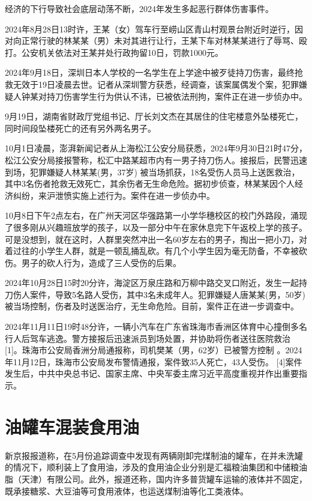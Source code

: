 经济的下行导致社会底层动荡不断，2024年发生多起恶行群体伤害事件。

2024年8月28日13时许，王某（女）驾车行至崂山区青山村观景台附近时逆行，因对向正常行驶的林某某（男）未对其进行让行，王某下车对林某某进行了辱骂、殴打。公安机关依法对王某并处行政拘留10日，罚款1000元。

2024年9月18日，深圳日本人学校的一名学生在上学途中被歹徒持刀伤害，最终抢救无效于19日凌晨去世。记者从深圳警方获悉，经调查，该案属偶发个案，犯罪嫌疑人钟某对持刀伤害学生行为供认不讳，已被依法刑拘，案件正在进一步侦办中。

9月19日，湖南省财政厅党组书记、厅长刘文杰在其居住的住宅楼意外坠楼死亡，同时间段坠楼死亡的还有另外两名男子。

10月1日凌晨，澎湃新闻记者从上海松江公安分局获悉，2024年9月30日21时47分，松江公安分局接报警称，松汇中路某超市内有一男子持刀伤人。接报后，民警迅速到场，犯罪嫌疑人林某某(男，37岁) 被当场抓获，18名受伤人员马上送医救治，其中3名伤者抢救无效死亡，其余伤者无生命危险。据初步侦查，林某某因个人经济纠纷，来沪泄愤实施上述行为。案件在进一步侦办中。

10月8日下午2点左右，在广州天河区华强路第一小学华穗校区的校门外路段，涌现了很多刚从兴趣班放学的孩子，以及一部分中午在家休息完下午返校上学的孩子。可是没想到，就在这时，人群里突然冲出一名60岁左右的男子，掏出一把小刀，对着过往的小学生人群，就是一顿乱捅乱砍。有几个小学生因为毫无防备，不幸被砍伤。男子的砍人行为，造成了三人受伤的后果。

2024年10月28日15时20分许，海淀区万泉庄路和万柳中路交叉口附近，发生一起持刀伤人案件，导致5名路人受伤，其中3名未成年人。犯罪嫌疑人唐某某(男，50岁)被当场控制，伤者及时送医治疗，无生命危险。目前，案件正在进一步调查中。

2024年11月11日19时48分许，一辆小汽车在广东省珠海市香洲区体育中心撞倒多名行人后驾车逃逸。警方接报后迅速派员到场处置，并协助将伤者送往医院救治 [1]。珠海市公安局香洲分局通报称，司机樊某（男，62岁）已被警方控制 。2024年11月12日，珠海市公安局发布警情通报，案件致35人死亡，43人受伤。 [4]案件发生后，中共中央总书记、国家主席、中央军委主席习近平高度重视并作出重要指示。

\section{油罐车混装食用油}

新京报报道称，在5月份追踪调查中发现有两辆刚卸完煤制油的罐车，在并未洗罐的情况下，顺利装上了食用油，涉及的食用油企业分别是汇福粮油集团和中储粮油脂（天津）有限公司。此外，报道还称，国内许多普货罐车运输的液体并不固定，既承接糖浆、大豆油等可食用液体，也运送煤制油等化工类液体。

